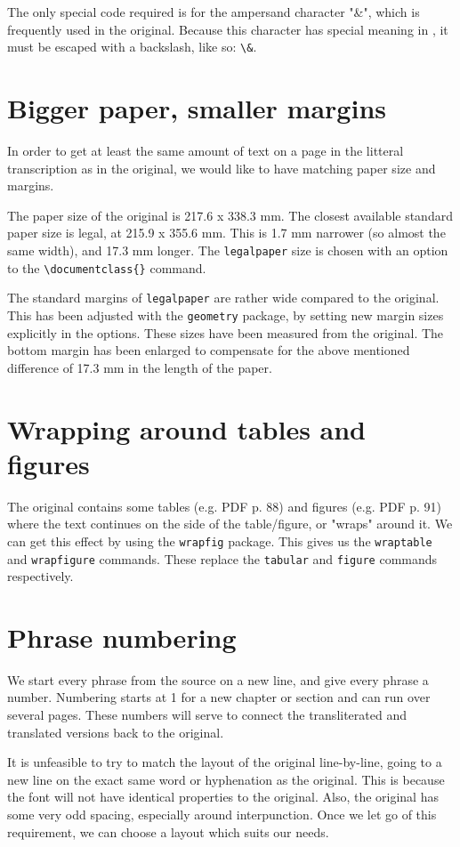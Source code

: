 \documentclass{report}
\begin{document}
The only special code required is for the ampersand character "\&", which is frequently used in the original. Because
this character has special meaning in \XeTeX, it must be escaped with a backslash, like so: \verb;\&;.

\section{Bigger paper, smaller margins}
In order to get at least the same amount of text on a page in the litteral
transcription as in the original, we would like to have matching paper size
and margins.

The paper size of the original is 217.6 x 338.3 mm. The closest available 
standard paper size is legal, at 215.9 x 355.6 mm. This is 1.7 mm narrower
(so almost the same width),
and 17.3 mm longer. The \texttt{legalpaper} size is chosen with an option
to the \verb;\documentclass{}; command.

The standard margins of \texttt{legalpaper} are rather wide compared to the original. This has been adjusted with the \texttt{geometry} package, by setting new margin sizes explicitly in the options. These sizes have been measured from
the original. The bottom margin has been enlarged to compensate for the above mentioned difference of 17.3 mm in the length of the paper.

\section{Wrapping around tables and figures}
The original contains some tables (e.g. PDF p. 88) and figures (e.g. PDF p. 91)
where the text continues on the side of the table/figure, or "wraps" around it.
We can get this effect by using the \texttt{wrapfig} package. This gives us the
\texttt{wraptable} and \texttt{wrapfigure} commands. These replace the
\texttt{tabular} and \texttt{figure} commands respectively.

\section{Phrase numbering}
We start every phrase from the source on a new line, and give every phrase a number. Numbering starts at 1 for
a new chapter or section and can run over several pages. These numbers will serve to connect the transliterated
and translated versions back to the original.

It is unfeasible to try to match the layout of the original line-by-line, going to a new line on the exact same word
or hyphenation as the original. This is because the font will not have identical properties to the original. Also,
the original has some very odd spacing, especially around interpunction. Once we let go of this requirement, we can
choose a layout which suits our needs.
\end{document}
